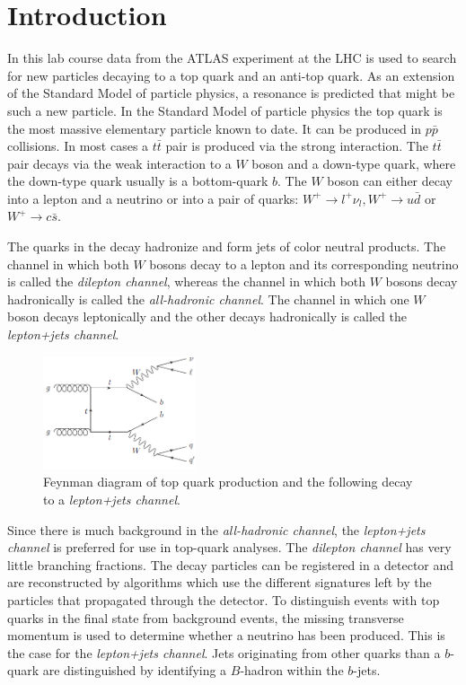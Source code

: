 \section{Introduction}
\label{sec:Introduction}

In this lab course data from the ATLAS experiment at the LHC is used to search for new particles decaying to a top quark and an anti-top quark. As an extension of the Standard Model of particle physics, a resonance is predicted that might be such a new particle. In the Standard Model of particle physics the top quark is the most massive elementary particle known to date. It can be produced in $p\bar{p}$ collisions. In most cases a $t\bar{t}$ pair is produced via the strong interaction. The $t\bar{t}$ pair decays via the weak interaction to a $W$ boson and a down-type quark, where the down-type quark usually is a bottom-quark $b$. The $W$ boson can either decay into a lepton and a neutrino or into a pair of quarks: $W^+ \rightarrow l^+ \nu_l, W^+ \rightarrow u\bar{d}$ or $W^+ \rightarrow c\bar{s}$.

The quarks in the decay hadronize and form jets of color neutral products. The channel in which both $W$ bosons decay to a lepton and its corresponding neutrino is called the \emph{dilepton channel}, whereas the channel in which both $W$ bosons decay hadronically is called the \emph{all-hadronic channel}. The channel in which one $W$ boson decays leptonically and the other decays hadronically is called the \emph{lepton+jets channel}.

\begin{figure}[H]
  \centering
  \includegraphics[width=0.4\textwidth]{graphics/decay.png}
  \caption{Feynman diagram of top quark production and the following decay to a \emph{lepton+jets channel}.}
  \label{fig:decay}
\end{figure}

Since there is much background in the \emph{all-hadronic channel}, the \emph{lepton+jets channel} is preferred for use in top-quark analyses. The \emph{dilepton channel} has very little branching fractions. The decay particles can be registered in a detector and are reconstructed by algorithms which use the different signatures left by the particles that propagated through the detector. To distinguish events with top quarks in the final state from background events, the missing transverse momentum is used to determine whether a neutrino has been produced. This is the case for the \emph{lepton+jets channel}.
Jets originating from other quarks than a $b$-quark are distinguished by identifying a $B$-hadron within the $b$-jets.

